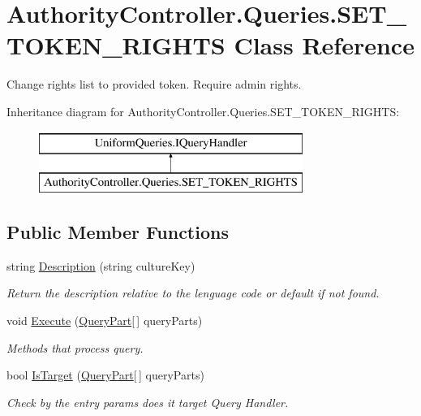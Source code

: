 \hypertarget{class_authority_controller_1_1_queries_1_1_s_e_t___t_o_k_e_n___r_i_g_h_t_s}{}\section{Authority\+Controller.\+Queries.\+S\+E\+T\+\_\+\+T\+O\+K\+E\+N\+\_\+\+R\+I\+G\+H\+TS Class Reference}
\label{class_authority_controller_1_1_queries_1_1_s_e_t___t_o_k_e_n___r_i_g_h_t_s}


Change rights list to provided token. Require admin rights.  


Inheritance diagram for Authority\+Controller.\+Queries.\+S\+E\+T\+\_\+\+T\+O\+K\+E\+N\+\_\+\+R\+I\+G\+H\+TS\+:\begin{figure}[H]
\begin{center}
\leavevmode
\includegraphics[height=2.000000cm]{d6/d9d/class_authority_controller_1_1_queries_1_1_s_e_t___t_o_k_e_n___r_i_g_h_t_s}
\end{center}
\end{figure}
\subsection*{Public Member Functions}
\begin{DoxyCompactItemize}
\item 
string \mbox{\hyperlink{class_authority_controller_1_1_queries_1_1_s_e_t___t_o_k_e_n___r_i_g_h_t_s_a149fb8950cf0ebbcb47b6a238c6458d2}{Description}} (string culture\+Key)
\begin{DoxyCompactList}\small\item\em Return the description relative to the lenguage code or default if not found. \end{DoxyCompactList}\item 
void \mbox{\hyperlink{class_authority_controller_1_1_queries_1_1_s_e_t___t_o_k_e_n___r_i_g_h_t_s_aebb323c8033e3a027f59c55a95695360}{Execute}} (\mbox{\hyperlink{struct_uniform_queries_1_1_query_part}{Query\+Part}}\mbox{[}$\,$\mbox{]} query\+Parts)
\begin{DoxyCompactList}\small\item\em Methods that process query. \end{DoxyCompactList}\item 
bool \mbox{\hyperlink{class_authority_controller_1_1_queries_1_1_s_e_t___t_o_k_e_n___r_i_g_h_t_s_a605feed66d357dc93ccc825068d83c96}{Is\+Target}} (\mbox{\hyperlink{struct_uniform_queries_1_1_query_part}{Query\+Part}}\mbox{[}$\,$\mbox{]} query\+Parts)
\begin{DoxyCompactList}\small\item\em Check by the entry params does it target Query Handler. \end{DoxyCompactList}\end{DoxyCompactItemize}


